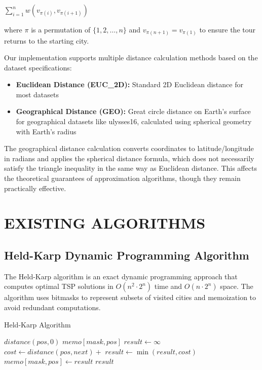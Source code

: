 \documentclass[sigconf]{acmart}
\begin{document}
$\sum_{i=1}^{n} w(v_{\pi(i)}, v_{\pi(i+1)})$

where $\pi$ is a permutation of $\{1, 2, \ldots, n\}$ and $v_{\pi(n+1)} = v_{\pi(1)}$ to ensure the tour returns to the starting city. 

Our implementation supports multiple distance calculation methods based on the dataset specifications:
\begin{itemize}
\item \textbf{Euclidean Distance (EUC\_2D):} Standard 2D Euclidean distance for most datasets
\item \textbf{Geographical Distance (GEO):} Great circle distance on Earth's surface for geographical datasets like ulysses16, calculated using spherical geometry with Earth's radius
\end{itemize}

The geographical distance calculation converts coordinates to latitude/longitude in radians and applies the spherical distance formula, which does not necessarily satisfy the triangle inequality in the same way as Euclidean distance. This affects the theoretical guarantees of approximation algorithms, though they remain practically effective.

\section{EXISTING ALGORITHMS}

\subsection{Held-Karp Dynamic Programming Algorithm}

The Held-Karp algorithm \cite{held1962dynamic} is an exact dynamic programming approach that computes optimal TSP solutions in $O(n^2 \cdot 2^n)$ time and $O(n \cdot 2^n)$ space. The algorithm uses bitmasks to represent subsets of visited cities and memoization to avoid redundant computations.

\begin{algorithm}
\caption{Held-Karp Algorithm}
\begin{algorithmic}[1]
        \State \Return $distance(pos, 0)$
    \EndIf
        \State \Return $memo[mask, pos]$
    \EndIf
    \State $result \leftarrow \infty$
            \State $cost \leftarrow distance(pos, next) + $ 
            \State $result \leftarrow \min(result, cost)$
        \EndIf
    \EndFor
    \State $memo[mask, pos] \leftarrow result$
    \State \Return $result$
\EndFunction
\end{algorithmic}
\end{algorithm}
\end{document}
